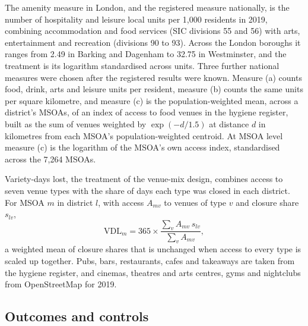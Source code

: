 \documentclass[11pt,a4paper]{article}
\begin{document}
The amenity measure in London, and the registered measure nationally, is the number of hospitality and leisure local units per 1,000 residents in 2019, combining accommodation and food services (SIC divisions 55 and 56) with arts, entertainment and recreation (divisions 90 to 93). Across the London boroughs it ranges from 2.49 in Barking and Dagenham to 32.75 in Westminster, and the treatment is its logarithm standardised across units. Three further national measures were chosen after the registered results were known. Measure (a) counts food, drink, arts and leisure units per resident, measure (b) counts the same units per square kilometre, and measure (c) is the population-weighted mean, across a district's MSOAs, of an index of access to food venues in the hygiene register, built as the sum of venues weighted by $\exp(-d/1.5)$ at distance $d$ in kilometres from each MSOA's population-weighted centroid. At MSOA level measure (c) is the logarithm of the MSOA's own access index, standardised across the 7,264 MSOAs.

Variety-days lost, the treatment of the venue-mix design, combines access to seven venue types with the share of days each type was closed in each district. For MSOA $m$ in district $l$, with access $A_{mv}$ to venues of type $v$ and closure share $s_{lv}$,
\begin{equation}\label{eq:vdl}
\mathrm{VDL}_m = 365 \times \frac{\sum_v A_{mv} \, s_{lv}}{\sum_v A_{mv}},
\end{equation}
a weighted mean of closure shares that is unchanged when access to every type is scaled up together. Pubs, bars, restaurants, cafes and takeaways are taken from the hygiene register, and cinemas, theatres and arts centres, gyms and nightclubs from OpenStreetMap for 2019.

\subsection{Outcomes and controls}
\end{document}
